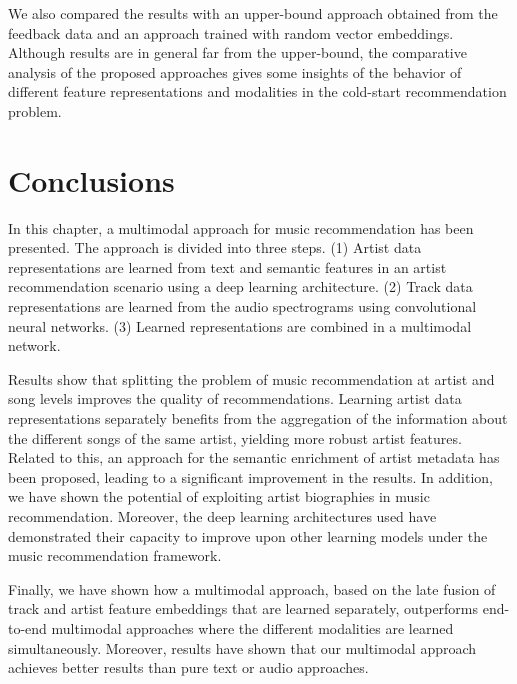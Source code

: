 We also compared the results with an upper-bound approach obtained from the feedback data and an approach trained with random vector embeddings. Although results are in general far from the upper-bound, the comparative analysis of the proposed approaches gives some insights of the behavior of different feature representations and modalities in the cold-start recommendation problem.



\section{Conclusions}
\label{sec:cold-rec:conclusions}

In this chapter, a multimodal approach for music recommendation has been presented. The approach is divided into three steps. (1) Artist data representations are learned from text and semantic features in an artist recommendation scenario using a deep learning architecture. (2) Track data representations are learned from the audio spectrograms using convolutional neural networks. (3) Learned representations are combined in a multimodal network.

Results show that splitting the problem of music recommendation at artist and song levels improves the quality of recommendations. 
Learning artist data representations separately benefits from the aggregation of the information about the different songs of the same artist, yielding more robust artist features. 
Related to this, an approach for the semantic enrichment of artist metadata has been proposed, leading to a significant improvement in the results. 
In addition, we have shown the potential of exploiting artist biographies in music recommendation. 
Moreover, the deep learning architectures used have demonstrated their capacity to improve upon other learning models under the music recommendation framework. 

Finally, we have shown how a multimodal approach, based on the late fusion of track and artist feature embeddings that are learned separately, outperforms end-to-end multimodal approaches where the different modalities are learned simultaneously. Moreover, results have shown that our multimodal approach achieves better results than pure text or audio approaches. 
